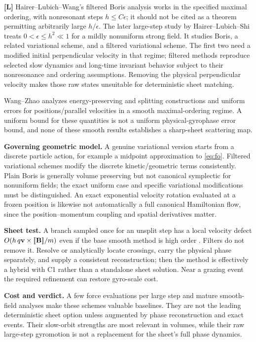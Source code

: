 \documentclass[10pt,a4paper]{article}
\newcommand{\B}{\mathbf B}\newcommand{\bunit}{\mathbf b}
\newcommand{\jump}[1]{[\![#1]\!]}
\newcommand{\lit}{\textbf{[L]}}
\begin{document}
\lit{} Hairer--Lubich--Wang's filtered Boris analysis \cite{filtered} works in the specified maximal ordering, with nonresonant steps $h\le C\epsilon$; it should not be cited as a theorem permitting arbitrarily large $h/\epsilon$. The later large-step study by Hairer--Lubich--Shi \cite{large} treats $0<\epsilon\le h^2\ll1$ for a mildly nonuniform strong field. It studies Boris, a related variational scheme, and a filtered variational scheme. The first two need a modified initial perpendicular velocity in that regime; filtered methods reproduce selected slow dynamics and long-time invariant behavior subject to their nonresonance and ordering assumptions. Removing the physical perpendicular velocity makes those raw states unsuitable for deterministic sheet matching.

Wang--Zhao \cite{wangzhao} analyzes energy-preserving and splitting constructions and uniform errors for positions/parallel velocities in a smooth maximal-ordering regime. A uniform bound for these quantities is not a uniform physical-gyrophase error bound, and none of these smooth results establishes a sharp-sheet scattering map.

\textbf{Governing geometric model.} A genuine variational version starts from a discrete particle action, for example a midpoint approximation to \eqref{eq:fo}. Filtered variational schemes modify the discrete kinetic/geometric terms consistently. Plain Boris is generally volume preserving but not canonical symplectic for nonuniform fields; the exact uniform case and specific variational modifications must be distinguished. An exact exponential velocity rotation evaluated at a frozen position is likewise not automatically a full canonical Hamiltonian flow, since the position--momentum coupling and spatial derivatives matter.

\textbf{Sheet test.} A branch sampled once for an unsplit step has a local velocity defect $O(h\,q\v\times\jump{\B}/m)$ even if the base smooth method is high order \cite{rejected}. Filters do not remove it. Resolve or analytically locate crossings, carry the physical phase separately, and supply a consistent reconstruction; then the method is effectively a hybrid with C1 rather than a standalone sheet solution. Near a grazing event the required refinement can restore gyro-scale cost.

\textbf{Cost and verdict.} A few force evaluations per large step and mature smooth-field analyses make these schemes valuable baselines. They are not the leading deterministic sheet option unless augmented by phase reconstruction and exact events. Their slow-orbit strengths are most relevant in volumes, while their raw large-step gyromotion is not a replacement for the sheet's full phase dynamics.
\end{document}
